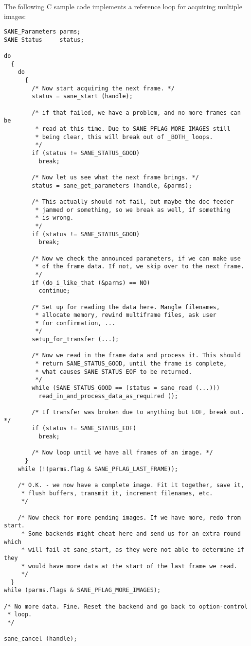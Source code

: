 \documentclass[11pt,DVIps]{report}
\begin{document}
\begin{changebar}
The following C sample code implements a reference loop for acquiring 
multiple images:

\begin{verbatim}
SANE_Parameters parms;
SANE_Status     status;

do
  {
    do
      {
        /* Now start acquiring the next frame. */
        status = sane_start (handle);

        /* if that failed, we have a problem, and no more frames can be 
         * read at this time. Due to SANE_PFLAG_MORE_IMAGES still 
         * being clear, this will break out of _BOTH_ loops. 
         */
        if (status != SANE_STATUS_GOOD)
          break;

        /* Now let us see what the next frame brings. */
        status = sane_get_parameters (handle, &parms);

        /* This actually should not fail, but maybe the doc feeder 
         * jammed or something, so we break as well, if something 
         * is wrong. 
         */
        if (status != SANE_STATUS_GOOD)
          break;

        /* Now we check the announced parameters, if we can make use 
         * of the frame data. If not, we skip over to the next frame. 
         */
        if (do_i_like_that (&parms) == NO)
          continue;

        /* Set up for reading the data here. Mangle filenames, 
         * allocate memory, rewind multiframe files, ask user 
         * for confirmation, ... 
         */
        setup_for_transfer (...);

        /* Now we read in the frame data and process it. This should 
         * return SANE_STATUS_GOOD, until the frame is complete, 
         * what causes SANE_STATUS_EOF to be returned. 
         */
        while (SANE_STATUS_GOOD == (status = sane_read (...)))
          read_in_and_process_data_as_required ();

        /* If transfer was broken due to anything but EOF, break out. */
        if (status != SANE_STATUS_EOF)
          break;

        /* Now loop until we have all frames of an image. */
      }
    while (!(parms.flag & SANE_PFLAG_LAST_FRAME));

    /* O.K. - we now have a complete image. Fit it together, save it, 
     * flush buffers, transmit it, increment filenames, etc. 
     */

    /* Now check for more pending images. If we have more, redo from start. 
     * Some backends might cheat here and send us for an extra round which 
     * will fail at sane_start, as they were not able to determine if they 
     * would have more data at the start of the last frame we read. 
     */
  }
while (parms.flags & SANE_PFLAG_MORE_IMAGES);

/* No more data. Fine. Reset the backend and go back to option-control 
 * loop. 
 */

sane_cancel (handle);
\end{verbatim}

\end{changebar}
\end{document}
